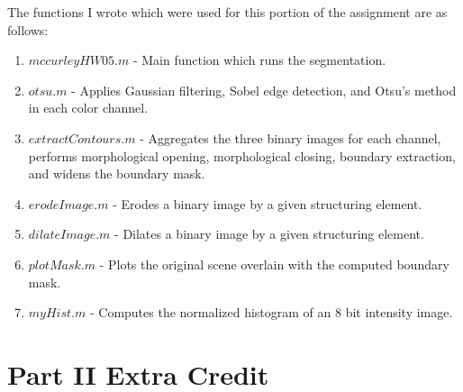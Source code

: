 \documentclass{article}[12 pt]
\begin{document}
\noindent
The functions I wrote which were used for this portion of the assignment are as follows:
\begin{enumerate}
\item $mccurleyHW05.m$ - Main function which runs the segmentation.
\item $otsu.m$ - Applies Gaussian filtering, Sobel edge detection, and Otsu's method in each color channel.
\item $extractContours.m$ - Aggregates the three binary images for each channel, performs morphological opening, morphological closing, boundary extraction, and widens the boundary mask.
\item $erodeImage.m$ - Erodes a binary image by a given structuring element.
\item $dilateImage.m$ - Dilates a binary image by a given structuring element. 
\item $plotMask.m$ - Plots the original scene overlain with the computed boundary mask.
\item $myHist.m$ - Computes the normalized histogram of an 8 bit intensity image.
\end{enumerate} 



\section*{Part II Extra Credit}
\end{document}
